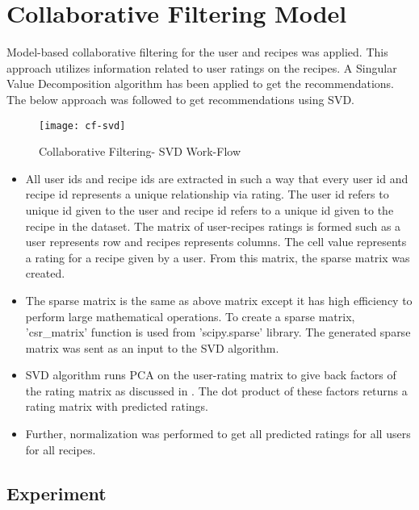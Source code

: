 \section{Collaborative Filtering Model}
\label{sec:cf}
Model-based collaborative filtering for the user and recipes was applied. This approach utilizes information related to user ratings on the recipes. A Singular Value Decomposition algorithm has been applied to get the recommendations. The below approach was followed to get recommendations using SVD.

\begin{figure}[H]
	\centering
	\texttt{[image: cf-svd]}
	\caption{Collaborative Filtering- SVD Work-Flow }
	\label{fig:cf-svd}
\end{figure}  

\begin{itemize}
\item All user ids and recipe ids are extracted in such a way that every user id and recipe id represents a unique relationship via rating. The user id refers to unique id given to the user and recipe id refers to a unique id given to the recipe in the dataset. The matrix of user-recipes ratings is formed such as a user represents row and recipes represents columns. The cell value represents a rating for a recipe given by a user. From this matrix, the sparse matrix was created. 
\item The sparse matrix is the same as above matrix except it has high efficiency to perform large mathematical operations. To create a sparse matrix, 'csr\_matrix' function is used from 'scipy.sparse' library. The generated sparse matrix was sent as an input to the SVD algorithm.
\item SVD algorithm runs PCA on the user-rating matrix to give back factors of the rating matrix as discussed in . The dot product of these factors returns a rating matrix with predicted ratings. 
\item Further, normalization was performed to get all predicted ratings for all users for all recipes.
\end{itemize}

\subsection{Experiment}
\label{sec:svd_exp}